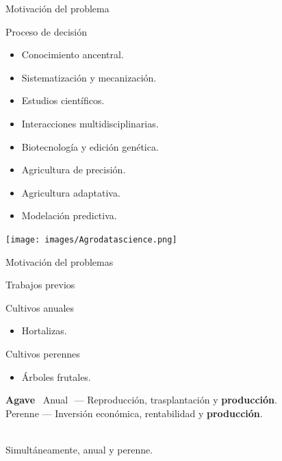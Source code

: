 \documentclass[aspectratio=169]{beamer}
\begin{document}
\begin{frame}{Motivación del problema}
	\begin{block}{\centering Proceso de decisión}
		\begin{minipage}{0.5\textwidth}
			\begin{itemize}
				\item Conocimiento ancentral.
				\item Sistematización y mecanización.
				\item Estudios científicos.
				\item Interacciones multidisciplinarias.
			\end{itemize}
		\end{minipage}%
		\begin{minipage}{0.5\textwidth}
			\begin{itemize}
				\item Biotecnología y edición genética.
				\item Agricultura de precisión.
				\item Agricultura adaptativa.
				\item Modelación predictiva.
			\end{itemize}
		\end{minipage}
	\end{block}
	\centering\texttt{[image: images/Agrodatascience.png]}
\end{frame}

\begin{frame}{Motivación del problemas}
	\begin{block}{\centering Trabajos previos}
		\begin{minipage}{0.5\textwidth}
			Cultivos anuales
			\begin{itemize}
				\item Hortalizas.
			\end{itemize}
		\end{minipage}%
		\begin{minipage}{0.5\textwidth}
			Cultivos perennes
			\begin{itemize}
				\item Árboles frutales.
			\end{itemize}
		\end{minipage}
	\end{block}
	\pause
	\centering\begin{minipage}{0.75\textwidth}
	\begin{block}{\bf Agave}
		\pause\,\,\,Anual\,\, --- Reproducción, trasplantación y {\bf producción}.\\
		\pause Perenne --- Inversión económica, rentabilidad y {\bf producción}. 
	\end{block}
\end{minipage}

\,\\

\pause\centering \Large  Simultáneamente, anual y perenne.
\end{frame}
\end{document}
